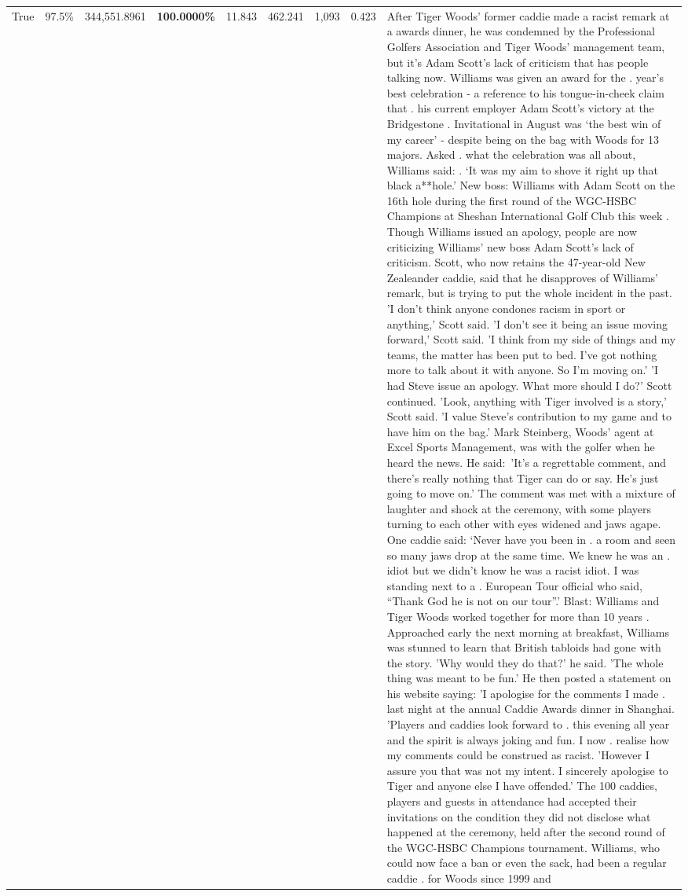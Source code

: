 \begin{table}[H]
\begin{tabular}{lllrlllll}
True & 97.5\% & 344,551.8961 & \bfseries \color{red} 100.0000\% & 11.843 & 462.241 & 1,093 & 0.423 & After Tiger Woods' former caddie made a racist remark at a awards dinner, he was condemned by the Professional Golfers Association and Tiger Woods' management team, but it's Adam Scott's lack of criticism that has people talking now. Williams was given an award for the . year’s best celebration - a reference to his tongue-in-cheek claim that . his current employer Adam Scott’s victory at the Bridgestone . Invitational in August was ‘the best win of my career’ - despite being on the bag with Woods for 13 majors. Asked . what the celebration was all about, Williams said: . ‘It was my aim to shove it right up that black a**hole.’ New boss: Williams with Adam Scott  on the 16th hole during the first round of the WGC-HSBC Champions at Sheshan International Golf Club this week . Though Williams issued an apology, people are now criticizing Williams' new boss Adam Scott's lack of criticism. Scott, who now retains the 47-year-old New Zealeander caddie, said that he disapproves of Williams' remark, but is trying to put the whole incident in the past. 'I don't think anyone condones racism in sport or anything,' Scott said. 'I don't see it being an issue moving forward,' Scott said. 'I think from my side of things and my teams, the matter has been put to bed. I've got nothing more to talk about it with anyone. So I'm moving on.' 'I had Steve issue an apology. What more should I do?' Scott continued. 'Look, anything with Tiger involved is a story,' Scott said. 'I value Steve's contribution to my game and to have him on the bag.' Mark Steinberg, Woods' agent at Excel Sports Management, was with the golfer when he heard the news. He said: 'It's a regrettable comment, and there's really nothing that Tiger can do or say. He's just going to move on.' The comment was met with a mixture of laughter and shock at the ceremony, with some players turning to each other with eyes widened and jaws agape. One caddie said: ‘Never have you been in . a room and seen so many jaws drop at the same time. We knew he was an . idiot but we didn’t know he was a racist idiot. I was standing next to a . European Tour official who said, “Thank God he is not on our tour”.’ Blast: Williams and Tiger Woods worked together for more than 10 years . Approached early the next morning at breakfast, Williams was stunned to learn that British tabloids had gone with the story. 'Why would they do that?' he said. 'The whole thing was meant to be fun.' He then posted a statement on his website saying: 'I apologise for the comments I made . last night at the annual Caddie Awards dinner in Shanghai. 'Players and caddies look forward to . this evening all year and the spirit is always joking and fun. I now . realise how my comments could be construed as racist. 'However I assure you that was not my intent. I sincerely apologise to Tiger and anyone else I have offended.' The 100 caddies, players and guests in attendance had accepted their invitations on the condition they did not disclose what happened at the ceremony, held after the second round of the WGC-HSBC Champions tournament. Williams, who could now face a ban or even the sack, had been a regular caddie . for Woods since 1999 and 
\end{tabular}
\end{table}
